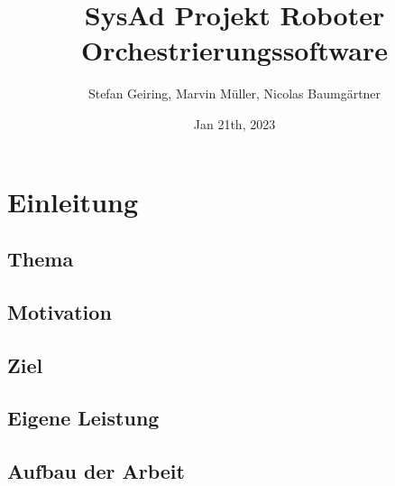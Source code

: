 \documentclass[11pt,oneside,a4paper,titlepage]{article}
\title{{SysAd Projekt Roboter Orchestrierungssoftware}}
\author{Stefan Geiring, Marvin Müller, Nicolas Baumgärtner}
\date{Jan 21th, 2023}
\begin{document}
\setlength{\parindent}{0pt}






\newpage

\pagestyle{fancy}


\tableofcontents

\fancyhead[RO,LE]{\nouppercase{\leftmark}}
\fancyfoot[RO,LE]{\thepage}

\renewcommand{\headrulewidth}{0.5pt}

\setcounter{page}{1}

\newpage


\section{Einleitung}

\subsection{Thema}


\subsection{Motivation}


\subsection{Ziel}


\subsection{Eigene Leistung}


\subsection{Aufbau der Arbeit}


\pagebreak
\end{document}

